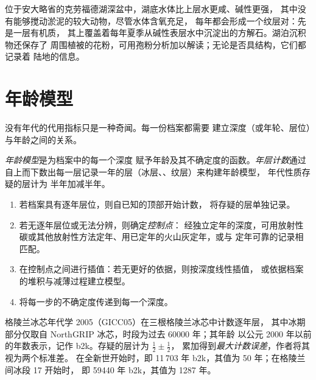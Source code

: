 位于安大略省的克劳福德湖深盆中，湖底水体比上层水更咸、碱性更强，
其中没有能够搅动淤泥的较大动物，尽管水体含氧充足，
每年都会形成一个纹层对：先是一层有机质，
其上覆盖着每年夏季从碱性表层水中沉淀出的方解石。湖泊沉积物还保存了
周围植被的花粉，可用孢粉分析加以解读；无论是否具结构，它们都记录着
陆地的信息。

\section{年龄模型}\label{sec:b2:climate-proxies:age}

没有年代的代用指标只是一种奇闻。每一份档案都需要
建立深度（或年轮、层位）与年龄之间的关系。

\begin{definition}\label{def:b2:climate-proxies:age-model}
\emph{年龄模型}是为档案中的每一个深度
赋予年龄及其不确定度的函数。\emph{年层计数}通过
自上而下数出每一层记录一年的层（冰层、、纹层）来构建年龄模型，
年代性质存疑的层计为
半年加减半年。
\end{definition}

\begin{method}[建立年龄模型]\label{met:b2:climate-proxies:age-model}
\begin{enumerate}
  \item 若档案具有逐年层位，则自已知的顶部开始计数，
        将存疑的层单独记录。
  \item 若无逐年层位或无法分辨，则确定\emph{控制点}：
        经独立定年的深度，可用放射性碳或其他放射性方法定年、用已定年的火山灰定年，或与
        定年可靠的记录相匹配。
  \item 在控制点之间进行插值：若无更好的依据，则按深度线性插值，
        或依据档案的堆积与减薄过程建立模型。
  \item 将每一步的不确定度传递到每一个深度。
\end{enumerate}
\end{method}

格陵兰冰芯年代学 2005（GICC05）在三根格陵兰冰芯中计数逐年层，
其中冰期部分仅取自 NorthGRIP 冰芯，时段为过去 \num{60000} 年；其年龄
以公元 2000 年以前的年数表示，记作 b2k。存疑的层计为 $\frac12 \pm \frac12$，
累加得到\emph{最大计数误差}，作者将其视为两个标准差。
在全新世开始时，即 11\,703 年 b2k，其值为 50 年；在格陵兰间冰段 17 开始时，
即 \num{59440} 年 b2k，其值为 \num{1287} 年。

